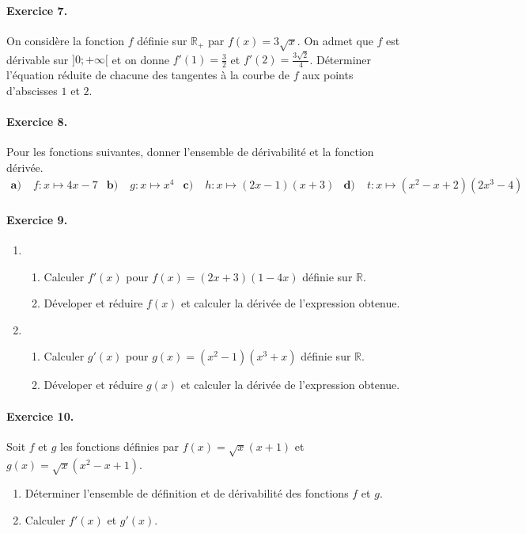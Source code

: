 \documentclass[11pt]{article}
\begin{document}
\paragraph{Exercice 7.} On considère la fonction $f$ définie sur
$\mathbb{R}_+$ par $f(x)=3\sqrt x$. On admet que $f$ est dérivable sur $]0;
+\infty[$ et on donne $f'(1)=\frac{3}{2}$ et $f'(2)=\frac{3\sqrt{2}}{4}$.
Déterminer l'équation réduite de chacune des tangentes à la courbe de $f$ aux
points d'abscisses $1$ et $2$.

\paragraph{Exercice 8.} Pour les fonctions suivantes, donner l'ensemble de
dérivabilité et la fonction dérivée.
\begin{align*}
  \textbf{a)}\;& f:x\mapsto 4x-7 &
  \textbf{b)}\;& g:x\mapsto x^4 &
  \textbf{c)}\;& h:x\mapsto (2x-1)(x+3) &
  \textbf{d)}\;& t:x\mapsto (x^2-x+2)(2x^3-4)
\end{align*}

\paragraph{Exercice 9.}
\begin{enumerate}
  \item \begin{enumerate}
      \item Calculer $f'(x)$ pour $f(x)=(2x+3)(1-4x)$ définie sur $\mathbb{R}$.
      \item Déveloper et réduire $f(x)$ et calculer la dérivée de l'expression
        obtenue.
    \end{enumerate}
  \item \begin{enumerate}
      \item Calculer $g'(x)$ pour $g(x)=(x^2-1)(x^3+x)$ définie sur
        $\mathbb{R}$.
      \item Déveloper et réduire $g(x)$ et calculer la dérivée de l'expression
        obtenue.
    \end{enumerate}
\end{enumerate}

\paragraph{Exercice 10.} Soit $f$ et $g$ les fonctions définies par $f(x)=\sqrt
x(x+1)$ et $g(x)=\sqrt x(x^2-x+1)$.
\begin{enumerate}
  \item Déterminer l'ensemble de définition et de dérivabilité des fonctions $f$
    et $g$.
  \item Calculer $f'(x)$ et $g'(x)$.
\end{enumerate}
\end{document}
